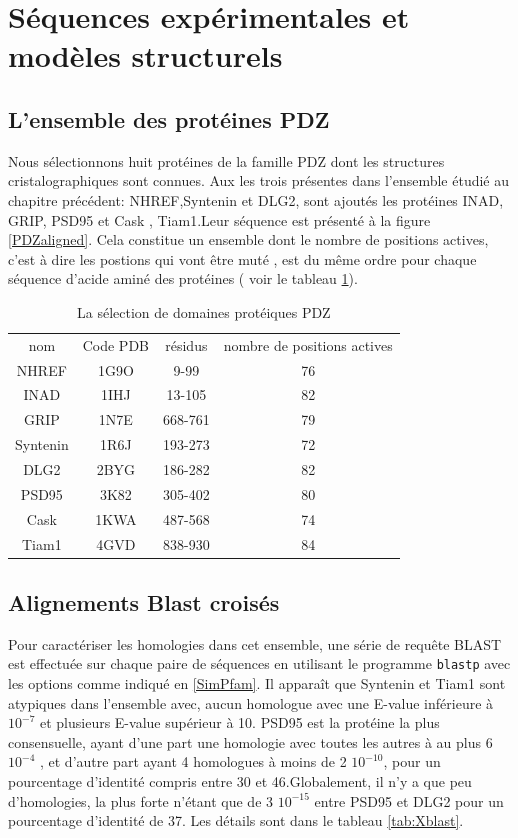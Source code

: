 \section{Séquences expérimentales et modèles structurels}
\subsection{L'ensemble des protéines PDZ}

Nous sélectionnons huit protéines de la famille PDZ dont les structures cristalographiques sont connues. Aux les trois présentes dans l'ensemble étudié au chapitre précédent:  NHREF,Syntenin et DLG2, sont ajoutés les protéines INAD, GRIP, PSD95 et Cask , Tiam1.Leur séquence est présenté à la figure \ref{PDZaligned}. Cela constitue un ensemble dont le nombre de positions actives, c'est à dire les postions qui vont être muté , est du même ordre pour chaque séquence d'acide aminé des protéines ( voir le tableau \ref{tab:protéines_PDZ}).


\begin{table}[!htbp]
  \centering
  \caption{La sélection de domaines protéiques PDZ}
  \begin{tabular}{cccc}
    \toprule
    nom & Code PDB & résidus & nombre de positions actives\\
    \cmidrule{1-4}
    NHREF    & 1G9O  & 9-99    & 76 \\
    INAD     & 1IHJ  & 13-105  & 82 \\
    GRIP     & 1N7E  & 668-761 & 79 \\
    Syntenin & 1R6J  & 193-273 & 72 \\
    DLG2     & 2BYG  & 186-282 & 82 \\
    PSD95    & 3K82  & 305-402 & 80 \\
    Cask     & 1KWA  & 487-568 & 74 \\
    Tiam1    & 4GVD  & 838-930 & 84 \\
    \bottomrule
    
  \end{tabular}      
  \label{tab:protéines_PDZ}      
\end{table}

\subsection{Alignements Blast croisés}
   
Pour caractériser les homologies dans cet ensemble, une série de requête BLAST est effectuée sur chaque paire de séquences en utilisant le programme \verb!blastp! avec les options comme indiqué en \ref{SimPfam}. Il apparaît que Syntenin et Tiam1 sont atypiques dans l'ensemble avec, aucun homologue avec une E-value inférieure à $10^{-7}$ et plusieurs E-value supérieur à 10. PSD95 est la protéine la plus consensuelle, ayant d'une part une homologie avec toutes les autres à au plus 6 $10^{-4}$ , et d'autre part ayant 4 homologues à moins de 2 $10^{-10}$, pour un pourcentage d'identité compris entre 30 et 46.Globalement, il n'y a que peu d'homologies, la plus forte n'étant que de 3 $10^{-15}$ entre PSD95 et DLG2 pour un pourcentage d'identité de 37. Les détails sont dans le tableau \ref{tab:Xblast}.



